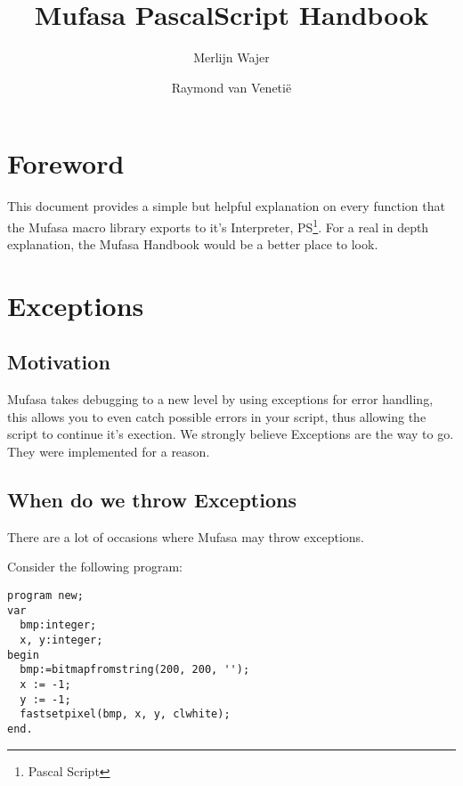 \documentclass[a4paper]{report}
\begin{document}
\title{Mufasa PascalScript Handbook}
\author{Merlijn Wajer \and Raymond van Veneti\"{e}}


\def\pproc{\textbf{procedure}}
\def\pfunc{\textbf{function}}
\newcommand{\pvtype}[1]{{\color{typeGreen}{#1}};}
\newcommand{\pvtypel}[1]{{\color{typeGreen}{#1}}}
\newcommand{\pvname}[1]{{\color{typeRed}{#1}}:}
\newcommand{\mname}[1]{{\color{blue}{#1}}}


\maketitle
\tableofcontents

\chapter{Foreword}

This document provides a simple but helpful explanation on every function that
the Mufasa macro library exports to it's Interpreter, PS\footnote{Pascal
Script}. For a real in depth explanation, the Mufasa Handbook would be a better
place to look.

\chapter{Exceptions}

\section{Motivation}
Mufasa takes debugging to a new level by using exceptions for error handling,
this allows you to even catch possible errors in your script, thus allowing
the script to continue it's exection. We strongly believe Exceptions are the
way to go. They were implemented for a reason.

\section{When do we throw Exceptions}

There are a lot of occasions where Mufasa may throw exceptions.

Consider the following program:

\begin{verbatim}
program new;
var
  bmp:integer;
  x, y:integer;
begin
  bmp:=bitmapfromstring(200, 200, '');
  x := -1;
  y := -1;
  fastsetpixel(bmp, x, y, clwhite);
end.
\end{verbatim}
\end{document}
